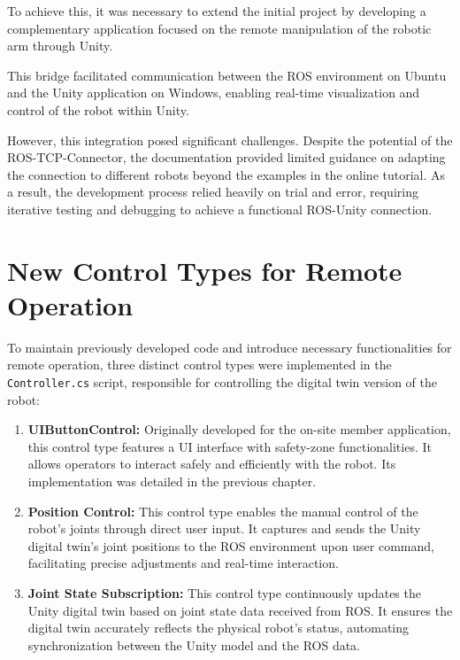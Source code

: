     To achieve this, it was necessary to extend the initial project by developing a complementary application focused on the remote manipulation 
    of the robotic arm through Unity. 

    This bridge facilitated communication between the ROS environment on Ubuntu and the Unity application on Windows, enabling real-time visualization 
    and control of the robot within Unity.

    However, this integration posed significant challenges. Despite the potential of the ROS-TCP-Connector, the documentation provided limited guidance 
    on adapting the connection to different robots beyond the examples in the online tutorial. As a result, the development process relied heavily on 
    trial and error, requiring iterative testing and debugging to achieve a functional ROS-Unity connection.

    
    
    
    \section{New Control Types for Remote Operation}
    To maintain previously developed code and introduce necessary functionalities for remote operation, three distinct control types were implemented in the \texttt{Controller.cs} script, responsible for controlling the digital twin version of the robot:
    
    \begin{enumerate}
        \item \textbf{UIButtonControl:} Originally developed for the on-site member application, this control type features a UI interface with safety-zone functionalities. It allows operators to interact safely and efficiently with the robot. Its implementation was detailed in the previous chapter.
        \item \textbf{Position Control:} This control type enables the manual control of the robot's joints through direct user input. It captures and sends the Unity digital twin's joint positions to the ROS environment upon user command, facilitating precise adjustments and real-time interaction.
        \item \textbf{Joint State Subscription:} This control type continuously updates the Unity digital twin based on joint state data received from ROS. It ensures the digital twin accurately reflects the physical robot's status, automating synchronization between the Unity model and the ROS data.
    \end{enumerate}
    

